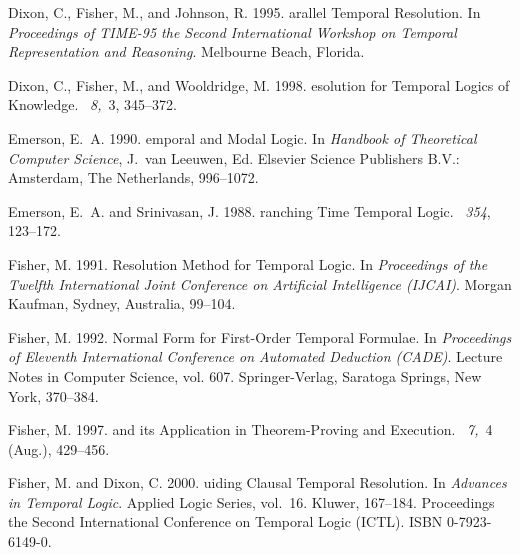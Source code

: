 \documentclass[nohyperref]{acmtrans2f}
\begin{document}
\begin{thebibliography}{}
{\sc Dixon, C.}, {\sc Fisher, M.}, {\sc and} {\sc Johnson, R.} 1995.
arallel {T}emporal {R}esolution.
\newblock In {\em Proceedings of TIME-95 the Second International Workshop on
  Temporal Representation and Reasoning}. Melbourne Beach, Florida.

{\sc Dixon, C.}, {\sc Fisher, M.}, {\sc and} {\sc Wooldridge, M.} 1998.
esolution for {T}emporal {L}ogics of {K}nowledge.
~{\em 8,\/}~3, 345--372.

{\sc Emerson, E.~A.} 1990.
emporal and {M}odal {L}ogic.
\newblock In {\em Handbook of Theoretical Computer Science}, {J.~van Leeuwen},
  Ed. Elsevier Science Publishers B.V.: Amsterdam, The Netherlands, 996--1072.

{\sc Emerson, E.~A.} {\sc and} {\sc Srinivasan, J.} 1988.
ranching {T}ime {T}emporal {L}ogic.
~{\em 354}, 123--172.

{\sc Fisher, M.} 1991.
 {R}esolution {M}ethod for {T}emporal {L}ogic.
\newblock In {\em Proceedings of the Twelfth International Joint Conference on
  Artificial Intelligence (IJCAI)}. Morgan Kaufman, Sydney, Australia, 99--104.

{\sc Fisher, M.} 1992.
 {N}ormal {F}orm for {F}irst-{O}rder {T}emporal {F}ormulae.
\newblock In {\em Proceedings of Eleventh International Conference on Automated
  Deduction (CADE)}. Lecture Notes in Computer Science, vol. 607.
  Springer-Verlag, Saratoga Springs, New York, 370--384.

{\sc Fisher, M.} 1997.
 and its {Application in
  Theorem-Proving and Execution}.
~{\em 7,\/}~4 (Aug.),
  429--456.

{\sc Fisher, M.} {\sc and} {\sc Dixon, C.} 2000.
uiding {C}lausal {T}emporal {R}esolution.
\newblock In {\em Advances in Temporal Logic}. Applied Logic Series, vol.~16.
  Kluwer, 167--184.
\newblock Proceedings the Second International Conference on Temporal Logic
  (ICTL). ISBN 0-7923-6149-0.


\end{thebibliography}
\end{document}
